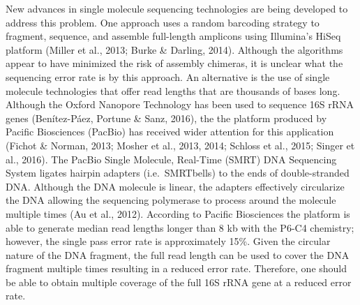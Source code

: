 \documentclass[11pt,]{article}
\begin{document}
New advances in single molecule sequencing technologies are being
developed to address this problem. One approach uses a random barcoding
strategy to fragment, sequence, and assemble full-length amplicons using
Illumina's HiSeq platform (Miller et al., 2013; Burke \& Darling, 2014).
Although the algorithms appear to have minimized the risk of assembly
chimeras, it is unclear what the sequencing error rate is by this
approach. An alternative is the use of single molecule technologies that
offer read lengths that are thousands of bases long. Although the Oxford
Nanopore Technology has been used to sequence 16S rRNA genes
(Benítez-Páez, Portune \& Sanz, 2016), the the platform produced by
Pacific Biosciences (PacBio) has received wider attention for this
application (Fichot \& Norman, 2013; Mosher et al., 2013, 2014; Schloss
et al., 2015; Singer et al., 2016). The PacBio Single Molecule,
Real-Time (SMRT) DNA Sequencing System ligates hairpin adapters
(i.e.~SMRTbells) to the ends of double-stranded DNA. Although the DNA
molecule is linear, the adapters effectively circularize the DNA
allowing the sequencing polymerase to process around the molecule
multiple times (Au et al., 2012). According to Pacific Biosciences the
platform is able to generate median read lengths longer than 8 kb with
the P6-C4 chemistry; however, the single pass error rate is
approximately 15\%. Given the circular nature of the DNA fragment, the
full read length can be used to cover the DNA fragment multiple times
resulting in a reduced error rate. Therefore, one should be able to
obtain multiple coverage of the full 16S rRNA gene at a reduced error
rate.
\end{document}
